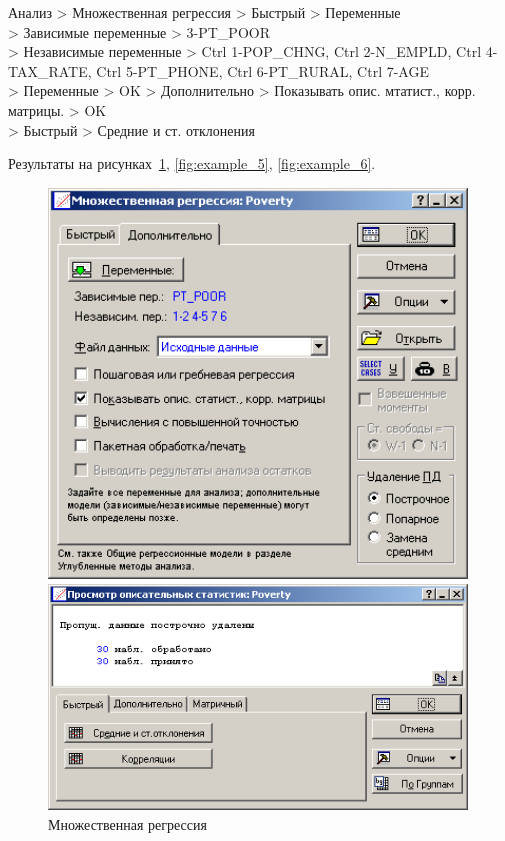 Анализ > Множественная регрессия > Быстрый > Переменные\\
> Зависимые переменные > 3-PT\_POOR\\
> Независимые переменные > Ctrl 1-POP\_CHNG, Ctrl 2-N\_EMPLD,
Ctrl 4-TAX\_RATE, Ctrl 5-PT\_PHONE, Ctrl 6-PT\_RURAL, Ctrl 7-AGE\\
> Переменные > OK > Дополнительно > Показывать опис. мтатист., корр. матрицы. > OK\\
> Быстрый > Средние и ст. отклонения

Результаты на рисунках~\ref{fig:example_4}, \ref{fig:example_5}, \ref{fig:example_6}.

\begin{figure}[!h]
  \centering
  \begin{minipage}{0.36\textwidth}
    \centering

    \includegraphics[width=0.99\textwidth]
    {inc/example_4.PNG}

    \caption{Множественная регрессия}
    \label{fig:example_4}
  \end{minipage}
  \begin{minipage}{0.36\textwidth}
    \centering

    \includegraphics[width=0.99\textwidth]
    {inc/example_5.PNG}


\end{minipage}
\end{figure}
